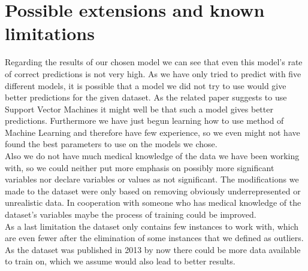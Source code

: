 \section{Possible extensions and known limitations}
Regarding the results of our chosen model we can see that even this model's rate of correct predictions is not very high. As we have only tried to predict with five different models, it is possible that a model we did not try to use would give better predictions for the given dataset. As the related paper suggests to use Support Vector Machines it might well be that such a model gives better predictions. Furthermore we have just begun learning how to use method of Machine Learning and therefore have few experience, so we even might not have found the best parameters to use on the models we chose. \\

Also we do not have much medical knowledge of the data we have been working with, so we could neither put more emphasis on possibly more significant variables nor declare variables or values as not significant. The modifications we made to the dataset were only based on removing obviously underrepresented or unrealistic data. In cooperation with someone who has medical knowledge of the dataset's variables maybe the process of training could be improved.\\

As a last limitation the dataset only contains few instances to work with, which are even fewer after the elimination of some instances that we defined as outliers. As the dataset was published in 2013 by now there could be more data available to train on, which we assume would also lead to better results.
